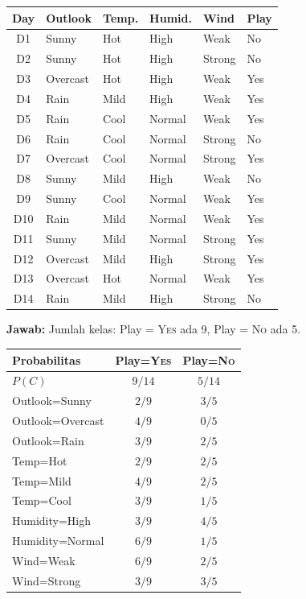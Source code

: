 \documentclass[10pt,a4paper,twocolumn]{article}
\newcommand{\jawab}{\textbf{Jawab: }}
\newcommand{\yes}{\textsc{Yes}}
\newcommand{\no}{\textsc{No}}
\begin{document}
\begin{center}
\scriptsize
\begin{tabular}{@{}clllll@{}}
\toprule
Day & Outlook & Temp. & Humid. & Wind & Play \\
\midrule
D1 & Sunny & Hot & High & Weak & No \\
D2 & Sunny & Hot & High & Strong & No \\
D3 & Overcast & Hot & High & Weak & Yes \\
D4 & Rain & Mild & High & Weak & Yes \\
D5 & Rain & Cool & Normal & Weak & Yes \\
D6 & Rain & Cool & Normal & Strong & No \\
D7 & Overcast & Cool & Normal & Strong & Yes \\
D8 & Sunny & Mild & High & Weak & No \\
D9 & Sunny & Cool & Normal & Weak & Yes \\
D10 & Rain & Mild & Normal & Weak & Yes \\
D11 & Sunny & Mild & Normal & Strong & Yes \\
D12 & Overcast & Mild & High & Strong & Yes \\
D13 & Overcast & Hot & Normal & Weak & Yes \\
D14 & Rain & Mild & High & Strong & No \\
\bottomrule
\end{tabular}
\end{center}

\jawab Jumlah kelas: Play = \yes{} ada 9, Play = \no{} ada 5.

\begin{center}
\scriptsize
\begin{tabular}{@{}lcc@{}}
\toprule
Probabilitas & Play=\yes & Play=\no \\
\midrule
$P(C)$ & $9/14$ & $5/14$ \\
Outlook=Sunny & $2/9$ & $3/5$ \\
Outlook=Overcast & $4/9$ & $0/5$ \\
Outlook=Rain & $3/9$ & $2/5$ \\
Temp=Hot & $2/9$ & $2/5$ \\
Temp=Mild & $4/9$ & $2/5$ \\
Temp=Cool & $3/9$ & $1/5$ \\
Humidity=High & $3/9$ & $4/5$ \\
Humidity=Normal & $6/9$ & $1/5$ \\
Wind=Weak & $6/9$ & $2/5$ \\
Wind=Strong & $3/9$ & $3/5$ \\
\bottomrule
\end{tabular}
\end{center}
\end{document}
